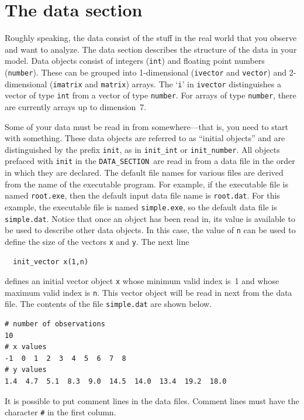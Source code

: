 \documentclass{admbmanual}
\newcommand\DS{\texttt{DATA\_SECTION}}
\begin{document}
\section{The data section}

Roughly speaking, the data consist of the stuff in the real world that you
observe and want to analyze. The data section describes the structure of the
data in your model. Data objects consist of integers (\texttt{int}) and floating
point numbers (\texttt{number}). These can be grouped into 1-dimensional
(\texttt{ivector} and \texttt{vector}) and 2-dimensional (\texttt{imatrix} and
\texttt{matrix}) arrays. The `\texttt{i}' in \texttt{ivector} distinguishes a
vector of type \texttt{int} from a vector of type \texttt{number}. For arrays of
type \texttt{number}, there are currently arrays up to dimension~7.

Some of your data must be read in from somewhere---that is, you need to start
with something. These data objects are referred to as ``initial objects'' and
are distinguished by the prefix \texttt{init}, as in \texttt{init\_int} or
\texttt{init\_number}. All objects prefaced with \texttt{init} in the \DS\ are
read in from a data file in the order in which they are declared. The default
file names for various files are derived from the name of the executable
program. For example, if the executable file is named \texttt{root.exe}, then
the default input data file name is \texttt{root.dat}. For this example, the
executable file is named \texttt{simple.exe}, so the default data file is
\texttt{simple.dat}. Notice that once an object has been read in, its value is
available to be used to describe other data objects. In this case, the value of
\texttt{n} can be used to define the size of the vectors \texttt{x} and
\texttt{y}. The next line
\begin{lstlisting}
  init_vector x(1,n)
\end{lstlisting}
defines an initial vector object \texttt{x} whose minimum valid index is~1 and
whose maximum valid index is \texttt{n}. This vector object will be read in
next from the data file. The contents of the file \texttt{simple.dat} are shown
below.
\begin{lstlisting}
# number of observations
10
# x values
-1  0  1  2  3  4  5  6  7  8
# y values
1.4  4.7  5.1  8.3  9.0  14.5  14.0  13.4  19.2  18.0
\end{lstlisting}
It is possible to put comment lines in the data files.
Comment lines must have the character {\tt\#} in the first column.
\end{document}

